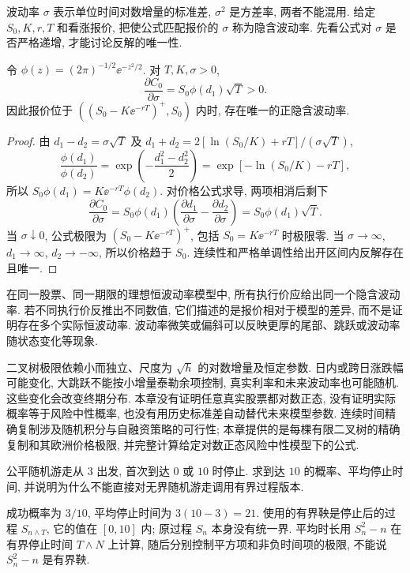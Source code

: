 波动率 $\sigma$ 表示单位时间对数增量的标准差, $\sigma^2$ 是方差率, 两者不能混用. 给定 $S_0,K,r,T$ 和看涨报价, 把使公式匹配报价的 $\sigma$ 称为隐含波动率. 先看公式对 $\sigma$ 是否严格递增, 才能讨论反解的唯一性.

\begin{proposition}[波动率敏感度]
令 $\phi(z)=(2\pi)^{-1/2}\ee^{-z^2/2}$. 对 $T,K,\sigma>0$,
\[
 \frac{\partial C_0}{\partial\sigma}
 =S_0\phi(d_1)\sqrt T>0.
\]
因此报价位于 $((S_0-K\ee^{-rT})^+,S_0)$ 内时, 存在唯一的正隐含波动率.
\end{proposition}
\begin{proof}
由 $d_1-d_2=\sigma\sqrt T$ 及
$d_1+d_2=2[\ln(S_0/K)+rT]/(\sigma\sqrt T)$,
\[
 \frac{\phi(d_1)}{\phi(d_2)}
 =\exp\left(-\frac{d_1^2-d_2^2}{2}\right)
 =\exp[-\ln(S_0/K)-rT],
\]
所以 $S_0\phi(d_1)=K\ee^{-rT}\phi(d_2)$.
对价格公式求导, 两项相消后剩下
\[
 \frac{\partial C_0}{\partial\sigma}
 =S_0\phi(d_1)\left(\frac{\partial d_1}{\partial\sigma}
             -\frac{\partial d_2}{\partial\sigma}\right)
 =S_0\phi(d_1)\sqrt T.
\]
当 $\sigma\downarrow0$, 公式极限为 $(S_0-K\ee^{-rT})^+$, 包括 $S_0=K\ee^{-rT}$ 时极限零. 当 $\sigma\to\infty$, $d_1\to\infty$, $d_2\to-\infty$, 所以价格趋于 $S_0$. 连续性和严格单调性给出开区间内反解存在且唯一.
\end{proof}
在同一股票、同一期限的理想恒波动率模型中, 所有执行价应给出同一个隐含波动率. 若不同执行价反推出不同数值, 它们描述的是报价相对于模型的差异, 而不是证明存在多个实际恒波动率. 波动率微笑或偏斜可以反映更厚的尾部、跳跃或波动率随状态变化等现象.

二叉树极限依赖小而独立、尺度为 $\sqrt h$ 的对数增量及恒定参数. 日内或跨日涨跌幅可能变化, 大跳跃不能按小增量泰勒余项控制, 真实利率和未来波动率也可能随机. 这些变化会改变终期分布. 本章没有证明任意真实股票都对数正态, 没有证明实际概率等于风险中性概率, 也没有用历史标准差自动替代未来模型参数. 连续时间精确复制涉及随机积分与自融资策略的可行性; 本章提供的是每棵有限二叉树的精确复制和其欧洲价格极限, 并完整计算给定对数正态风险中性模型下的公式.

\begin{exercise}
公平随机游走从 $3$ 出发, 首次到达 $0$ 或 $10$ 时停止. 求到达 $10$ 的概率、平均停止时间, 并说明为什么不能直接对无界随机游走调用有界过程版本.
\end{exercise}
\begin{solution}
成功概率为 $3/10$, 平均停止时间为 $3(10-3)=21$. 使用的有界鞅是停止后的过程 $S_{n\wedge T}$, 它的值在 $[0,10]$ 内; 原过程 $S_n$ 本身没有统一界. 平均时长用 $S_n^2-n$ 在有界停止时间 $T\wedge N$ 上计算, 随后分别控制平方项和非负时间项的极限, 不能说 $S_n^2-n$ 是有界鞅.
\end{solution}

